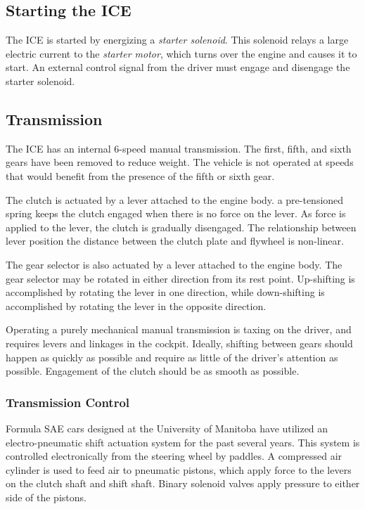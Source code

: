 
\subsection{Starting the ICE}

The ICE is started by energizing a \emph{starter solenoid}. This solenoid relays a large electric current to the \emph{starter motor}, which turns over the engine and causes it to start. An external control signal from the driver must engage and disengage the starter solenoid.

\subsection{Transmission}

The ICE has an internal 6-speed manual transmission. The first, fifth, and sixth gears have been removed to reduce weight. The vehicle is not operated at speeds that would benefit from the presence of the fifth or sixth gear.

The clutch is actuated by a lever attached to the engine body. a pre-tensioned spring keeps the clutch engaged when there is no force on the lever. As force is applied to the lever, the clutch is gradually disengaged. The relationship between lever position the distance between the clutch plate and flywheel is non-linear. 

The gear selector is also actuated by a lever attached to the engine body. The gear selector may be rotated in either direction from its rest point. Up-shifting is accomplished by rotating the lever in one direction, while down-shifting is accomplished by rotating the lever in the opposite direction. 

Operating a purely mechanical manual transmission is taxing on the driver, and requires levers and linkages in the cockpit. Ideally, shifting between gears should happen as quickly as possible and require as little of the driver's attention as possible. Engagement of the clutch should be as smooth as possible.

\subsubsection{Transmission Control}
\label{sec:transmission_control_background}

Formula SAE cars designed at the University of Manitoba have utilized an electro-pneumatic shift actuation system for the past several years. This system is controlled electronically from the steering wheel by paddles. A compressed air cylinder is used to feed air to pneumatic pistons, which apply force to the levers on the clutch shaft and shift shaft. Binary solenoid valves apply pressure to either side of the pistons. 

